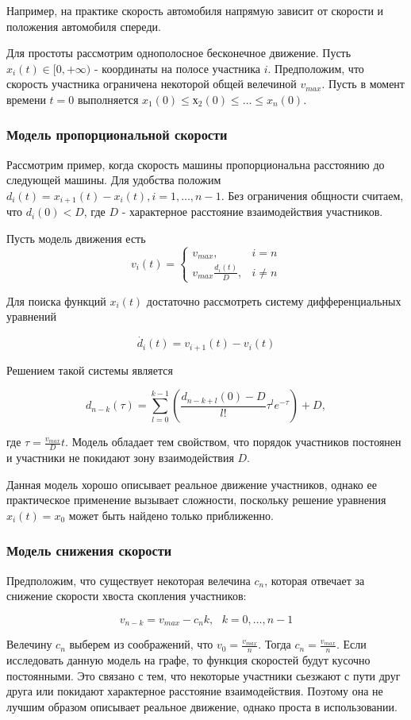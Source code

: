 \documentclass[12pt, a4paper]{article}
\begin{document}
Например, на практике скорость автомобиля напрямую зависит от скорости и положения автомобиля спереди. 

Для простоты рассмотрим однополосное бесконечное движение. Пусть $x_i(t) \in [0, +\infty)$ - координаты на полосе участника $i$. Предположим, что скорость участника ограничена некоторой общей велечиной $v_{max}$. Пусть в момент времени $t = 0$ выполняется $x_1(0) \le х_2(0) \le \dots \le x_n(0)$.

\subsubsection*{Модель пропорциональной скорости}
Рассмотрим пример, когда скорость машины пропорциональна расстоянию до следующей машины.
Для удобства положим $d_{i} (t) = x_{i + 1} (t) - x_{i} (t), i = 1, \dots, n - 1$.
Без ограничения общности считаем, что  $d_{i} (0) < D$, где $D$ - характерное расстояние взаимодействия участников.

Пусть модель движения есть
\begin{equation}
	\label{eq:micro}
	v_i(t)=
	\begin{cases}
		v_{max}, & i = n
		\\
		v_{max} \frac{d_i(t)}{D} ,& i \ne n
	\end{cases}
\end{equation}

Для поиска функций $x_i(t)$ достаточно рассмотреть систему дифференциальных уравнений

$$ \dot{d_i} (t) = v_{i + 1} (t) - v_i (t) $$

Решением такой системы является

$$d_{n - k} (\tau) = \sum \limits_{l = 0} ^ {k - 1} \left(\frac{d_{n - k + l} (0) - D}{l!} \tau^l e ^ {-\tau}\right) + D ,$$

где $\tau = \frac{v_{max}}{D}t$. Модель обладает тем свойством, что порядок участников постоянен и участники не покидают зону взаимодействия $D$. 

Данная модель хорошо описывает реальное движение участников, однако ее практическое применение вызывает сложности, поскольку решение уравнения $x_i (t) = x_0$ может быть найдено только приближенно.

\subsubsection*{Модель снижения скорости}

Предположим, что существует некоторая велечина $c_n$, которая отвечает за снижение скорости хвоста скопления участников:

$$v_{n - k} = v_{max} - c_n k, \text{  } k = 0, \dots, n - 1$$

Велечину $c_n$ выберем из соображений, что $v_0 = \frac{v_{max}}{n}$. Тогда $c_n = \frac{v_{max}}{n}$. Если исследовать данную модель на графе, то функция скоростей будут кусочно постоянными. Это связано с тем, что некоторые участники сьезжают с пути друг друга или покидают характерное расстояние взаимодействия. Поэтому она не лучшим образом описывает реальное движение, однако проста в использовании.
\end{document}
